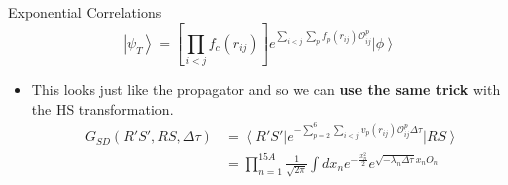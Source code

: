 \documentclass{beamer}
\newcommand{\ket}[1]{\left| #1 \right>}
\newcommand{\bra}[1]{\left< #1 \right|}
\newcommand{\fpij}{f_p(r_{ij})}
\newcommand{\Opij}{\mathcal{O}_{ij}^p}
\newcommand{\dt}{\Delta\tau}
\begin{document}
\begin{frame}{Exponential Correlations}
\begin{equation*}
   \ket{\psi_T} = \left[\prod\limits_{i<j}f_c(r_{ij})\right] e^{\sum\limits_{i<j}\sum\limits_p\fpij\Opij} \ket{\phi}
\end{equation*}
\begin{itemize}
   \item This looks just like the propagator and so we can {\bf use the same trick} with the HS transformation.
\begin{align*}
   G_{SD}(R'S',RS,\dt) &= \bra {R'S'}e^{-\sum\limits_{p=2}^6\sum\limits_{i<j}v_p(r_{ij})\Opij\dt} \ket{RS} \\
      &= \prod\limits_{n=1}^{15A}\frac{1}{\sqrt{2\pi}}\int dx_n e^{-\frac{x_n^2}{2}}e^{\sqrt{-\lambda_n\dt} x_nO_n}
\end{align*}
\end{itemize}
\end{frame}
\end{document}
